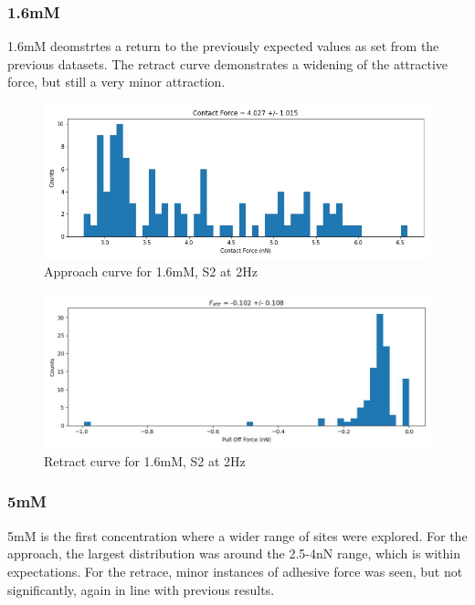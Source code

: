 \newpage

\subsubsection*{1.6mM}
1.6mM deomstrtes a return to the previously expected values as set from the previous datasets. The retract curve demonstrates a widening of the attractive force, but still a very minor attraction.
\begin{figure}[h!]
\centering
\includegraphics[width=\textwidth]{chapter7/Tip speed/1.6mM/S1 2Hz/approach_f_c_hist.jpg}
\caption{Approach curve for 1.6mM, S2 at 2Hz}
\end{figure}

\begin{figure}[h!]
\centering
\includegraphics[width=\textwidth]{chapter7/Tip speed/1.6mM/S1 2Hz/retract_f_a_hist.jpg}
\caption{Retract curve for 1.6mM, S2 at 2Hz}
\end{figure}

\newpage

\subsubsection*{5mM}
5mM is the first concentration where a wider range of sites were explored. For the approach, the largest distribution was around the 2.5-4nN range, which is within expectations. For the retrace, minor instances of adhesive force was seen, but not significantly, again in line with previous results.

